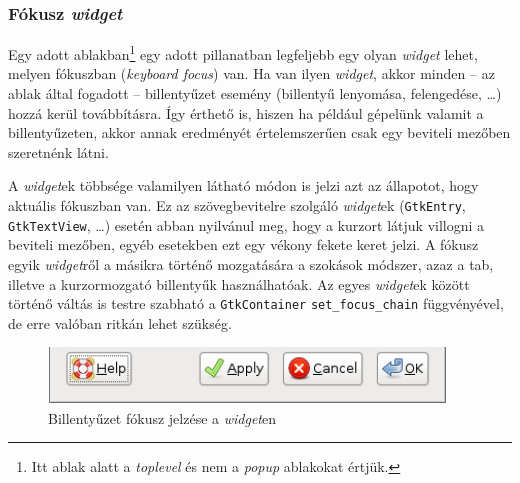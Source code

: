 \subsubsection{Fókusz \textit{widget}}
\label{sec:widgetfocus}

Egy adott ablakban\footnote{Itt ablak alatt a \textit{toplevel} és nem a \textit{popup} ablakokat értjük.} egy adott pillanatban legfeljebb egy olyan \textit{widget} lehet, melyen fókuszban (\textit{keyboard focus}) van. Ha van ilyen \textit{widget}, akkor minden -- az ablak által fogadott -- billentyűzet esemény (billentyű lenyomása, felengedése, \dots) hozzá kerül továbbításra. Így érthető is, hiszen ha például gépelünk valamit a billentyűzeten, akkor annak eredményét értelemszerűen csak egy beviteli mezőben  szeretnénk látni.

A \textit{widget}ek többsége valamilyen látható módon is jelzi azt az állapotot, hogy aktuális fókuszban van. Ez az szövegbevitelre szolgáló \textit{widget}ek (\texttt{GtkEntry}, \texttt{GtkTextView}, \dots) esetén abban nyilvánul meg, hogy a kurzort látjuk villogni a beviteli mezőben, egyéb esetekben ezt egy vékony fekete keret jelzi. A fókusz egyik \textit{widget}ről a másikra történő mozgatására a szokások módszer, azaz a tab, illetve a kurzormozgató billentyűk használhatóak. Az egyes \textit{widget}ek között történő váltás is testre szabható a \texttt{GtkContainer} \texttt{set\_focus\_chain} függvényével, de erre valóban ritkán lehet szükség.

\begin{figure}[H]
\begin{center}
\includegraphics[height=15mm]{images/widget-keyboard-focus.png}
\caption{Billentyűzet fókusz jelzése a \textit{widget}en\cite{gnomehig}}
\end{center}
\end{figure}

